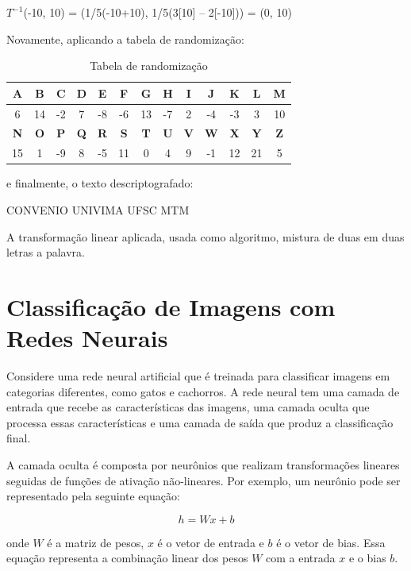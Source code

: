 \centerline{$T^{-1}$(-10, 10) = (1/5(-10+10), 1/5(3[10] – 2[-10])) = (0, 10)}

Novamente, aplicando a tabela de randomização:

\begin{table}[h]
	\centering
	\begin{tabular}{@{} *{13}{c} @{}}
		\toprule
		\textbf{A} & \textbf{B} & \textbf{C} & \textbf{D} & \textbf{E} & \textbf{F} & \textbf{G} & \textbf{H} & \textbf{I} & \textbf{J} & \textbf{K} & \textbf{L} & \textbf{M} \\
		\midrule
		6 & 14 & -2 & 7 & -8 & -6 & 13 & -7 & 2 & -4 & -3 & 3 & 10 \\
		\toprule
		\textbf{N} & \textbf{O} & \textbf{P} & \textbf{Q} & \textbf{R} & \textbf{S} & \textbf{T} & \textbf{U} & \textbf{V} & \textbf{W} & \textbf{X} & \textbf{Y} & \textbf{Z} \\
		\midrule
		15 & 1 & -9 & 8 & -5 & 11 & 0 & 4 & 9 & -1 & 12 & 21 & 5 \\
		\bottomrule
	\end{tabular}
	\caption{Tabela de randomização \cite{helio2009}}
\end{table}

\noindent e finalmente, o texto descriptografado:

\centerline{CONVENIO UNIVIMA UFSC MTM}

A transformação linear aplicada, usada como algoritmo, mistura de duas em duas letras a palavra.

\section{Classificação de Imagens com Redes Neurais}

Considere uma rede neural artificial que é treinada para classificar imagens em categorias diferentes, como gatos e cachorros. A rede neural tem uma camada de entrada que recebe as características das imagens, uma camada oculta que processa essas características e uma camada de saída que produz a classificação final.

A camada oculta é composta por neurônios que realizam transformações lineares seguidas de funções de ativação não-lineares. Por exemplo, um neurônio pode ser representado pela seguinte equação:

\begin{equation}
	h = Wx + b
\end{equation}

onde $W$ é a matriz de pesos, $x$ é o vetor de entrada e $b$ é o vetor de bias. Essa equação representa a combinação linear dos pesos $W$ com a entrada $x$ e o bias $b$.

